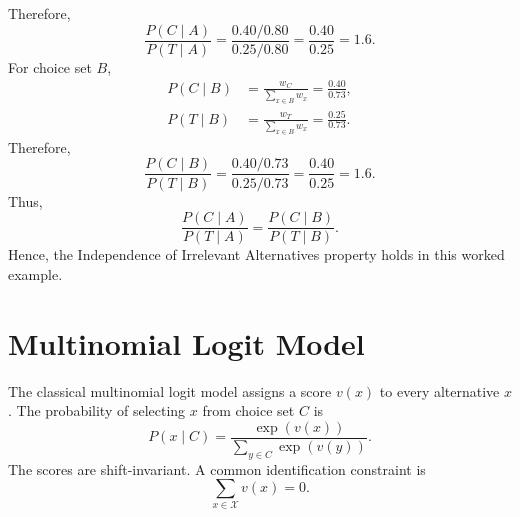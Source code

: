 \documentclass[12pt,oneside]{report}
\newcommand{\X}{\mathcal{X}}
\begin{document}
Therefore,
\begin{equation}
    \frac{P(C\mid A)}{P(T\mid A)}
    =
    \frac{0.40/0.80}{0.25/0.80}
    =
    \frac{0.40}{0.25}
    =
    1.6.
\end{equation}
For choice set \(B\),
\begin{align*}
    P(C\mid B)
    &=
    \frac{w_C}{\sum_{x\in B}w_x}
    =
    \frac{0.40}{0.73},
    \\
    P(T\mid B)
    &=
    \frac{w_T}{\sum_{x\in B}w_x}
    =
    \frac{0.25}{0.73}.
\end{align*}
Therefore,
\begin{equation}
    \frac{P(C\mid B)}{P(T\mid B)}
    =
    \frac{0.40/0.73}{0.25/0.73}
    =
    \frac{0.40}{0.25}
    =
    1.6.
\end{equation}
Thus,
\begin{equation}
    \frac{P(C\mid A)}{P(T\mid A)}
    =
    \frac{P(C\mid B)}{P(T\mid B)}.
\end{equation}
Hence, the Independence of Irrelevant Alternatives property holds in this
worked example.
\section{Multinomial Logit Model}
The classical multinomial logit model assigns a score \(v(x)\) to every
alternative \(x\). The probability of selecting \(x\) from choice set \(C\)
is
\begin{equation}
    P(x\mid C)
    =
    \frac{\exp(v(x))}
    {\displaystyle\sum_{y\in C}\exp(v(y))}.
    \label{eq:mnl}
\end{equation}
The scores are shift-invariant. A common identification constraint is
\begin{equation}
    \sum_{x\in\X}v(x)=0.
    \label{eq:mnl-identification}
\end{equation}
\end{document}
